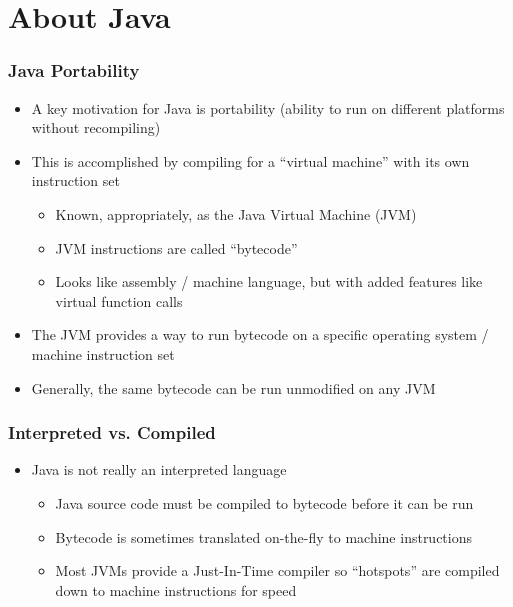 \documentclass{beamer}
\begin{document}
\section{About Java}
\begin{frame}
\frametitle{Java Portability}
\begin{itemize}
\item A key motivation for Java is portability (ability to run on different platforms without recompiling)
\item This is accomplished by compiling for a ``virtual machine'' with its own instruction set
\begin{itemize}
\item Known, appropriately, as the Java Virtual Machine (JVM)
\item JVM instructions are called ``bytecode''
\item Looks like assembly / machine language, but with added features like virtual function calls
\end{itemize}
\item The JVM provides a way to run bytecode on a specific operating system / machine instruction set
\item Generally, the same bytecode can be run unmodified on any JVM
\end{itemize}
\end{frame}

\begin{frame}
\frametitle{Interpreted vs. Compiled}
\begin{itemize}
\item Java is not really an interpreted language
\begin{itemize}
\item Java source code must be compiled to bytecode before it can be run
\item Bytecode is sometimes translated on-the-fly to machine instructions
\item Most JVMs provide a Just-In-Time compiler so ``hotspots'' are compiled down to machine instructions for speed
\end{itemize}
\end{itemize}
\end{frame}
\end{document}
